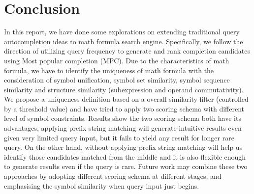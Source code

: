 \documentclass[12pt]{article} %
\begin{document}
\section{Conclusion}
In this report, we have done some explorations on extending traditional query autocompletion ideas to math formula search engine.
Specifically, we follow the direction of utilizing query frequency to generate and rank completion candidates using Most popular completion (MPC).
Due to the characteristics of math formula, we have to identify the uniqueness of math formula with the consideration of symbol unification, symbol set similarity, symbol sequence similarity and structure similarity (subexpression and operand commutativity).
We propose a uniqueness definition based on a overall similarity filter (controlled by a threshold value) and have tried to apply two scoring schema with different level of symbol constraints.
Results show the two scoring schema both have its advantages, 
applying prefix string matching will generate intuitive results even given very limited query input, but it fails to yield any result for longer rare query. On the other hand,
without applying prefix string matching will help us identify those candidates matched from the middle and it is also flexible enough to generate results even if the query is rare.
Future work may combine these two approaches by adopting different scoring schema at different stages, and emphasising the symbol similarity when query input just begins.
{}

\end{document}
